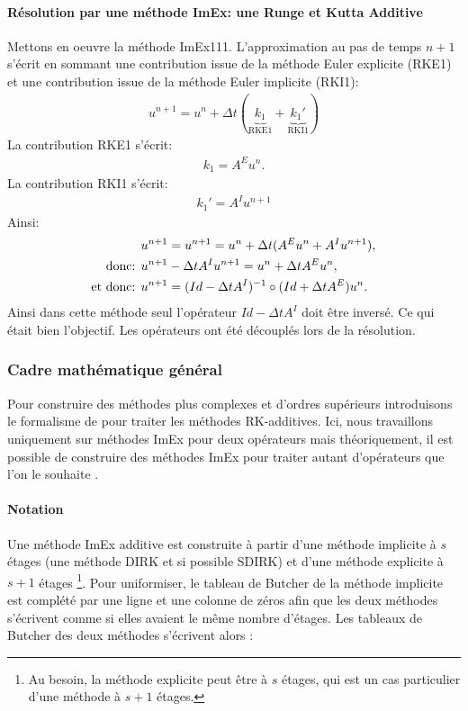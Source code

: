     \paragraph{Résolution par une méthode ImEx: une Runge et Kutta Additive}
            Mettons en oeuvre la méthode ImEx111. 
            L’approximation au pas de temps $n+1$ s'écrit en sommant une contribution issue de la méthode Euler explicite (RKE1)
            et une contribution issue de la méthode Euler implicite (RKI1):
            \begin{align}
                u^{n+1} = u^n + \Delta t (\underbrace{k_1}_{\text{RKE1}} + \underbrace{k_1'}_{\text{RKI1}})
            \end{align}
            La contribution RKE1 s'écrit:
            \begin{align}
                k_1 = A^E u^n.
            \end{align}
            La contribution RKI1 s'écrit:
            \begin{align}
                k_1' = A^I u^{n+1}
            \end{align}
            Ainsi: 
            \begin{align}
                &u^{n+1} = u^{n+1} = u^n + \Delta t ( A^E u^n +  A^I u^{n+1}),\\\notag
                \text{donc: }&u^{n+1} - \Delta t  A^I u^{n+1} = u^n + \Delta t  A^E u^n,\\\notag
                \text{et donc: }&u^{n+1} = (Id - \Delta t A^I)^{-1} \circ (Id + \Delta t A^E) u^n.
            \end{align}
            Ainsi dans cette méthode seul l’opérateur $Id- \Delta t A^I$ doit être inversé. Ce qui était bien l’objectif. Les opérateurs ont été 
            découplés lors de la résolution.
\subsubsection{Cadre mathématique général}
    Pour construire des méthodes plus complexes et d'ordres supérieurs introduisons le formalisme de \cite{ASCHER1997151} pour traiter les méthodes RK-additives. 
    Ici, nous travaillons uniquement sur méthodes ImEx pour deux opérateurs mais théoriquement, il est possible de construire des méthodes ImEx pour traiter 
    autant d'opérateurs que l'on le souhaite \cite{KENNEDY2003139}.
    \paragraph{Notation}%
        Une méthode ImEx additive est construite à partir d'une méthode implicite à $s$ étages (une méthode DIRK et si possible SDIRK) et d'une méthode explicite à $s+1$ étages
        \footnote{Au besoin, la méthode explicite peut être à $s$ étages, qui est un cas particulier d'une méthode à $s+1$ étages.}.
        Pour uniformiser, le tableau de Butcher de la méthode implicite est complété par une ligne et une colonne de zéros afin que les deux méthodes
        s'écrivent comme si elles avaient le même nombre d'étages.
        Les tableaux de Butcher des deux méthodes s'écrivent alors :
        
